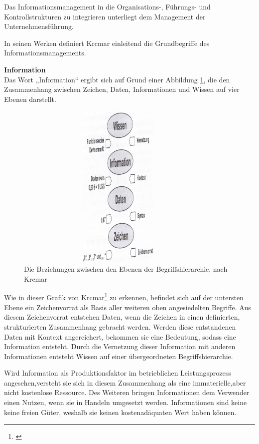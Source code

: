 Das Informationsmanagement in die Organisations-, Führungs- und Kontrollstrukturen zu integrieren unterliegt dem Management der Unternehmensführung.

In seinen Werken definiert Krcmar einleitend die Grundbegriffe des Informationsmanagements.

\textbf{Information}\\
Das Wort „Information“ ergibt sich auf Grund einer Abbildung \ref{fig_ebenen_begriffshierarchie}, die den Zusammenhang zwischen Zeichen, Daten, Informationen und Wissen auf vier Ebenen darstellt.

\begin{figure}[h!]
	\centering
	\includegraphics[width=10cm, height=8cm]
	{kapitel/gruppe1_1/bilder/ebenen_der_begriffshierarchie}
	\caption{Die Beziehungen zwischen den Ebenen der Begriffshierarchie, nach Krcmar}
	\label{fig_ebenen_begriffshierarchie}
\end{figure}

Wie in dieser Grafik von Krcmar\footnote{\cite{krcmar_einfuhrung_2015}} zu erkennen, befindet sich auf der untersten Ebene ein Zeichenvorrat als Basis aller weiteren oben angesiedelten Begriffe. 
Aus diesem Zeichenvorrat entstehen Daten, wenn die Zeichen in einen definierten, strukturierten Zusammenhang gebracht werden.
Werden diese entstandenen Daten mit Kontext angereichert, bekommen sie eine Bedeutung, sodass eine Information entsteht. 
Durch die Vernetzung dieser Information mit anderen Informationen entsteht Wissen auf einer übergeordneten Begriffshierarchie.

Wird Information als Produktionsfaktor im betrieblichen Leistungsprozess angesehen,versteht sie sich in diesem Zusammenhang als eine immaterielle,aber nicht kostenlose Ressource.
Des Weiteren bringen Informationen dem Verwender einen Nutzen, wenn sie in Handeln umgesetzt werden. Informationen sind keine keine freien Güter, weshalb sie keinen kostenadäquaten Wert haben können.

